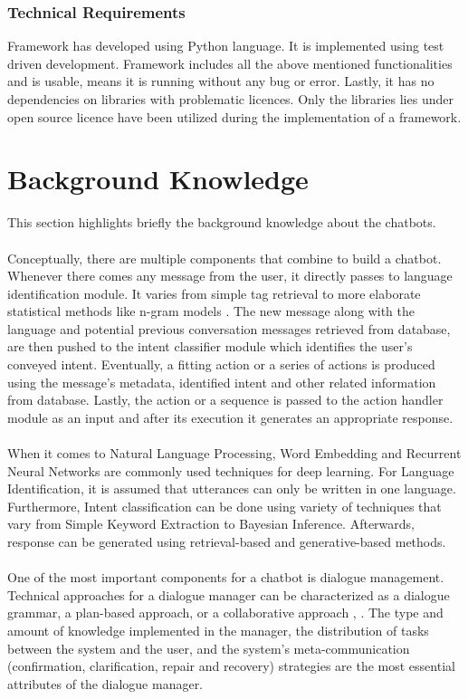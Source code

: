 \subsubsection*{Technical Requirements}
Framework has developed using Python language. It is implemented using test driven development. Framework includes all the above mentioned functionalities and is usable, means it is running without any bug or error. Lastly, it has no dependencies on libraries with problematic licences. Only the libraries lies under open source licence have been utilized during the implementation of a framework.

\section{Background Knowledge}
This section highlights briefly the background knowledge about the chatbots.
\\~\\
Conceptually, there are multiple components that combine to build a chatbot. Whenever there comes any message from the user, it directly passes to language identification module. It varies from simple tag retrieval to more elaborate statistical methods like n-gram models \cite{ngram} . The new message along with the language and potential previous conversation messages retrieved from database, are then pushed to the intent classifier module which identifies the user's conveyed intent. Eventually, a fitting action or a series of actions is produced using the message’s metadata, identified intent and other related information from database. Lastly, the action or a sequence is passed to the action handler module as an input and after its execution it generates an appropriate response. \cite{designandimplementation} 
\\~\\
When it comes to Natural Language Processing, Word Embedding and Recurrent Neural Networks are commonly used techniques for deep learning. For Language Identification, it is assumed that utterances can only be written in one language. Furthermore, Intent classification can be done using variety of techniques that vary from Simple Keyword Extraction to Bayesian Inference. Afterwards, response can be generated using retrieval-based and generative-based methods. \cite{designandimplementation} 
\\~\\
One of the most important components for a chatbot is dialogue management. Technical approaches for a dialogue manager can be characterized as a dialogue grammar, a plan-based approach, or a collaborative approach \cite{dialoguemanagementsystems}, \cite{spokenDialogueTechnology}. The type and amount of knowledge implemented in the manager, the distribution of tasks between the system and the user, and the system's meta-communication (confirmation, clarification, repair and recovery) strategies are the most essential attributes of the dialogue manager. \cite{subjectiveQualityEvaluation} 

